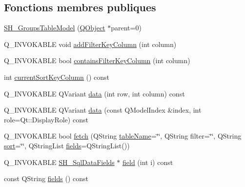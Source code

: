 \subsection*{Fonctions membres publiques}
\begin{DoxyCompactItemize}
\item 
\hyperlink{classSimpleHotel_1_1SH__GroupsTableModel_a55ac3cd4b77c2abe11186437829860d2}{S\-H\-\_\-\-Groups\-Table\-Model} (\hyperlink{classQObject}{Q\-Object} $\ast$parent=0)
\item 
Q\-\_\-\-I\-N\-V\-O\-K\-A\-B\-L\-E void \hyperlink{classSimpleHotel_1_1SH__ExtendedProxyModel_af8036ffa208ebaf55129cce307c3e296}{add\-Filter\-Key\-Column} (int column)
\item 
Q\-\_\-\-I\-N\-V\-O\-K\-A\-B\-L\-E bool \hyperlink{classSimpleHotel_1_1SH__ExtendedProxyModel_a4db5231a36976dd249ec1439422e331c}{contains\-Filter\-Key\-Column} (int column)
\item 
int \hyperlink{classSimpleHotel_1_1SH__ExtendedProxyModel_a2acd8779c72617f4b6a195ee9341b28b}{current\-Sort\-Key\-Column} () const 
\item 
Q\-\_\-\-I\-N\-V\-O\-K\-A\-B\-L\-E Q\-Variant \hyperlink{classSimpleHotel_1_1SH__ExtendedProxyModel_a24edf7c777ce9e00a07b30614ee71019}{data} (int row, int column) const 
\item 
Q\-\_\-\-I\-N\-V\-O\-K\-A\-B\-L\-E Q\-Variant \hyperlink{classSimpleHotel_1_1SH__ExtendedProxyModel_a25bc1047c6e9835d9d3c580e0a4ec42a}{data} (const Q\-Model\-Index \&index, int role=Qt\-::\-Display\-Role) const 
\item 
Q\-\_\-\-I\-N\-V\-O\-K\-A\-B\-L\-E bool \hyperlink{classSimpleHotel_1_1SH__ExtendedProxyModel_a422dc77c44ec3ded9291812efb128053}{fetch} (Q\-String \hyperlink{classSimpleHotel_1_1SH__ExtendedProxyModel_a49617ea8bab745425beec3dbd3fddba7}{table\-Name}=\char`\"{}\char`\"{}, Q\-String filter=\char`\"{}\char`\"{}, Q\-String \hyperlink{classSimpleHotel_1_1SH__ExtendedProxyModel_a5d7686a9fae295e0662057b8450c8a8d}{sort}=\char`\"{}\char`\"{}, Q\-String\-List \hyperlink{classSimpleHotel_1_1SH__ExtendedProxyModel_a4b57bc85b18fa1e71073526abb798fb6}{fields}=Q\-String\-List())
\item 
Q\-\_\-\-I\-N\-V\-O\-K\-A\-B\-L\-E \hyperlink{classSimpleHotel_1_1SH__SqlDataFields}{S\-H\-\_\-\-Sql\-Data\-Fields} $\ast$ \hyperlink{classSimpleHotel_1_1SH__ExtendedProxyModel_ac091225266a35c84307835f40d9b6e9b}{field} (int i) const 
\item 
const Q\-String \hyperlink{classSimpleHotel_1_1SH__ExtendedProxyModel_a4b57bc85b18fa1e71073526abb798fb6}{fields} () const 

\end{DoxyCompactItemize}
